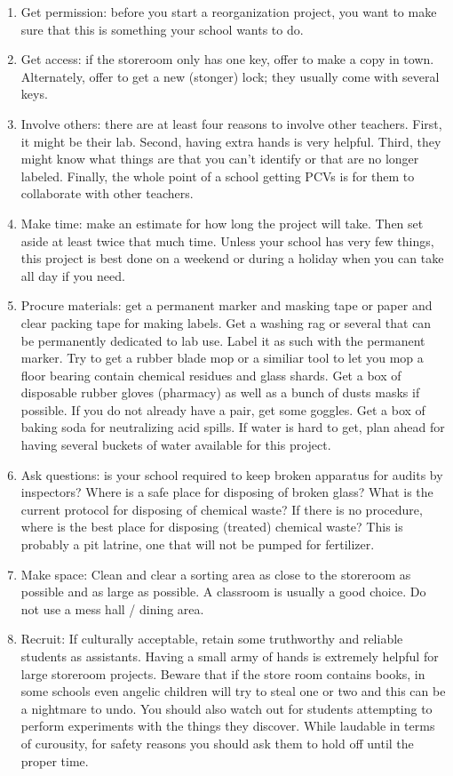 \documentclass{report}
\begin{document}
\begin{enumerate}
\item{Get permission: before you start a reorganization project, you want to make sure that this is something your school wants to do.}
\item{Get access: if the storeroom only has one key, offer to make a copy in town. Alternately, offer to get a new (stonger) lock; they usually come with several keys.}
\item{Involve others: there are at least four reasons to involve other teachers. First, it might be their lab. Second, having extra hands is very helpful. Third, they might know what things are that you can't identify or that are no longer labeled. Finally, the whole point of a school getting PCVs is for them to collaborate with other teachers.}
\item{Make time: make an estimate for how long the project will take. Then set aside at least twice that much time. Unless your school has very few things, this project is best done on a weekend or during a holiday when you can take all day if you need.}
\item{Procure materials: get a permanent marker and masking tape or paper and clear packing tape for making labels. Get a washing rag or several that can be permanently dedicated to lab use. Label it as such with the permanent marker. Try to get a rubber blade mop or a similiar tool to let you mop a floor bearing contain chemical residues and glass shards. Get a box of disposable rubber gloves (pharmacy) as well as a bunch of dusts masks if possible. If you do not already have a pair, get some goggles. Get a box of baking soda for neutralizing acid spills. If water is hard to get, plan ahead for having several buckets of water available for this project.}
\item{Ask questions: is your school required to keep broken apparatus for audits by inspectors? Where is a safe place for disposing of broken glass? What is the current protocol for disposing of chemical waste? If there is no procedure, where is the best place for disposing (treated) chemical waste? This is probably a pit latrine, one that will not be pumped for fertilizer.}
\item{Make space: Clean and clear a sorting area as close to the storeroom as possible and as large as possible. A classroom is usually a good choice. Do not use a mess hall / dining area.}
\item{Recruit: If culturally acceptable, retain some truthworthy and reliable students as assistants. Having a small army of hands is extremely helpful for large storeroom projects. Beware that if the store room contains books, in some schools even angelic children will try to steal one or two and this can be a nightmare to undo. You should also watch out for students attempting to perform experiments with the things they discover. While laudable in terms of curousity, for safety reasons you should ask them to hold off until the proper time.}

\end{enumerate}
\end{document}
